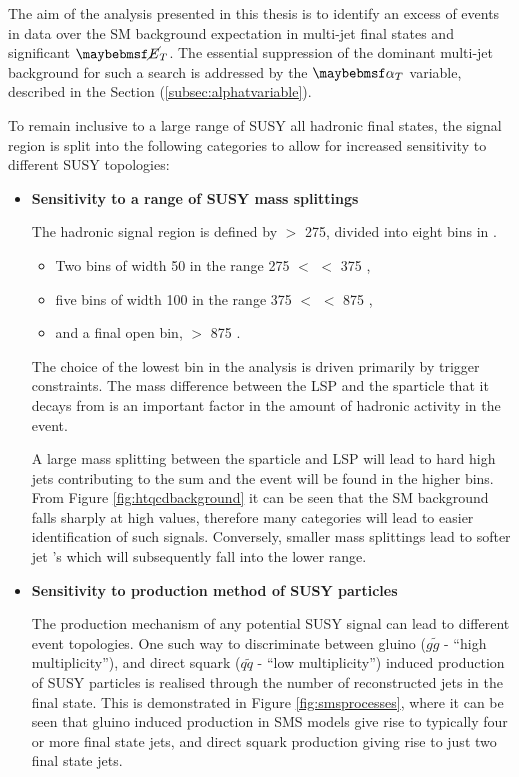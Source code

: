 The aim of the analysis presented in this thesis is to identify an excess of events in data over the \ac{SM} background expectation in multi-jet final states and significant $\met$. The essential suppression of the dominant multi-jet background for such a search is addressed by the $\alphat$ variable, described in the Section (\ref{subsec:alphatvariable}). 

To remain inclusive to a large range of \ac{SUSY} all hadronic final states, the signal region is split into the following categories to allow for increased sensitivity to different \ac{SUSY} topologies:

\begin{itemize}

\item[] \textbf{Sensitivity to a range of \ac{SUSY} mass splittings}

The hadronic signal region is defined by \theht $>$ 275, divided into eight bins in \theht. 

\begin{itemize}
\item Two bins of width 50 \GeV in the range 275 $<$ \theht $<$ 375 \GeV,
\item five bins of width 100 \GeV in the range 375 $<$ \theht$<$ 875 \GeV,
\item and a final open bin, \theht $>$ 875 \GeV.
\end{itemize}

The choice of the lowest \theht bin in the analysis is driven primarily by trigger constraints. The mass difference between the \ac{LSP} and the sparticle that it decays from is an important factor in the amount of hadronic activity in the event. 

A large mass splitting between the sparticle and \ac{LSP} will lead to hard high \pt jets contributing to the \theht sum and the event will be found in the higher \theht bins. From Figure \ref{fig:htqcdbackground} it can be seen that the \ac{SM} background falls sharply at high \theht values, therefore many \theht categories will lead to easier identification of such signals. Conversely, smaller mass splittings lead to softer jet \pt's which will subsequently fall into the lower \theht range.

\item[] \textbf{Sensitivity to production method of \ac{SUSY} particles}

The production mechanism of any potential \ac{SUSY} signal can lead to different event topologies. One such way to discriminate between gluino ($g\widetilde{g}$ - ``high multiplicity''), and direct squark ($q\widetilde{q}$ - ``low multiplicity'') induced production of \ac{SUSY} particles is realised through the number of reconstructed jets in the final state. This is demonstrated in Figure \ref{fig:smsprocesses}, where it can be seen that gluino induced production in \ac{SMS} models give rise to typically four or more final state jets, and direct squark production giving rise to just two final state jets.


\end{itemize}
